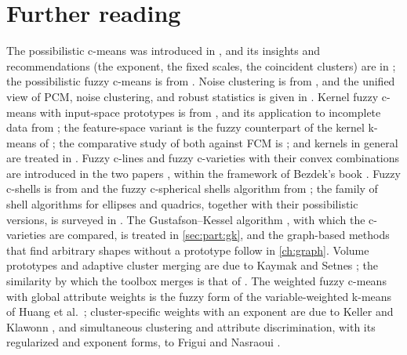 
\section{Further reading}\label{sec:robust:reading}

The possibilistic c-means was introduced in \cite{krishnapuram:1993:pcm}, and its insights and recommendations (the exponent, the fixed scales, the coincident clusters) are in \cite{krishnapuram:1996:pcm}; the possibilistic fuzzy c-means is from \cite{pal:2005:pfcm}. Noise clustering is from \cite{dave:1991:noise}, and the unified view of PCM, noise clustering, and robust statistics \cite{huber:1981:robust} is given in \cite{dave:1997:robust}. Kernel fuzzy c-means with input-space prototypes is from \cite{zhang:2004:kfcm}, and its application to incomplete data from \cite{zhang:2003:kfcm}; the feature-space variant is the fuzzy counterpart of the kernel k-means of \cite{girolami:2002:kernel}; the comparative study of both against FCM is \cite{graves:2010:kernel}; and kernels in general are treated in \cite{scholkopf:2002:kernels}. Fuzzy c-lines and fuzzy c-varieties with their convex combinations are introduced in the two papers \cite{bezdek:1981:fcv1,bezdek:1981:fcv2}, within the framework of Bezdek's book \cite{bezdek:1981}. Fuzzy c-shells is from \cite{dave:1990:shells} and the fuzzy c-spherical shells algorithm from \cite{krishnapuram:1992:fcss}; the family of shell algorithms for ellipses and quadrics, together with their possibilistic versions, is surveyed in \cite{krishnapuram:1995:shells}. The Gustafson--Kessel algorithm \cite{gustafson:1979}, with which the c-varieties are compared, is treated in \cref{sec:part:gk}, and the graph-based methods that find arbitrary shapes without a prototype follow in \cref{ch:graph}. Volume prototypes and adaptive cluster merging are due to Kaymak and Setnes \cite{kaymak:2002:volume}; the similarity by which the toolbox merges is that of \cite{setnes:1998:similarity}. The weighted fuzzy c-means with global attribute weights is the fuzzy form of the variable-weighted k-means of Huang et al.\ \cite{huang:2005:wkmeans}; cluster-specific weights with an exponent are due to Keller and Klawonn \cite{keller:2000:weighting}, and simultaneous clustering and attribute discrimination, with its regularized and exponent forms, to Frigui and Nasraoui \cite{frigui:2004:scad}.
